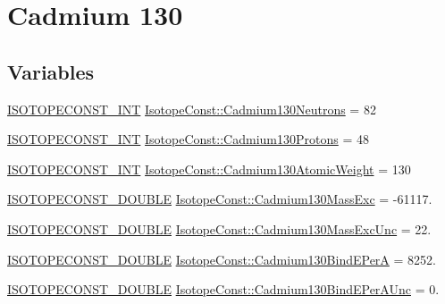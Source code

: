 \hypertarget{group___isotope_const-_cadmium-_cd130}{}\section{Cadmium 130}
\label{group___isotope_const-_cadmium-_cd130}
\subsection*{Variables}
\begin{DoxyCompactItemize}
\item 
\mbox{\hyperlink{group___isotope_const-_macros_ga5f18360b3e99483a35c32d789e62621c}{I\+S\+O\+T\+O\+P\+E\+C\+O\+N\+S\+T\+\_\+\+I\+NT}} \mbox{\hyperlink{group___isotope_const-_cadmium-_cd130_gaacc3bf0a1a699ef1e801e687e548a5df}{Isotope\+Const\+::\+Cadmium130\+Neutrons}} = 82
\item 
\mbox{\hyperlink{group___isotope_const-_macros_ga5f18360b3e99483a35c32d789e62621c}{I\+S\+O\+T\+O\+P\+E\+C\+O\+N\+S\+T\+\_\+\+I\+NT}} \mbox{\hyperlink{group___isotope_const-_cadmium-_cd130_ga5b8234c01437195f8fe9cbf0a4318621}{Isotope\+Const\+::\+Cadmium130\+Protons}} = 48
\item 
\mbox{\hyperlink{group___isotope_const-_macros_ga5f18360b3e99483a35c32d789e62621c}{I\+S\+O\+T\+O\+P\+E\+C\+O\+N\+S\+T\+\_\+\+I\+NT}} \mbox{\hyperlink{group___isotope_const-_cadmium-_cd130_ga6cf69b042d5b1b2da75dd718f164ce2d}{Isotope\+Const\+::\+Cadmium130\+Atomic\+Weight}} = 130
\item 
\mbox{\hyperlink{group___isotope_const-_macros_ga8f45a7272ce02c0b4c65c44636ed719a}{I\+S\+O\+T\+O\+P\+E\+C\+O\+N\+S\+T\+\_\+\+D\+O\+U\+B\+LE}} \mbox{\hyperlink{group___isotope_const-_cadmium-_cd130_ga9df458bf60ba75393d56ed997371ef48}{Isotope\+Const\+::\+Cadmium130\+Mass\+Exc}} = -\/61117.
\item 
\mbox{\hyperlink{group___isotope_const-_macros_ga8f45a7272ce02c0b4c65c44636ed719a}{I\+S\+O\+T\+O\+P\+E\+C\+O\+N\+S\+T\+\_\+\+D\+O\+U\+B\+LE}} \mbox{\hyperlink{group___isotope_const-_cadmium-_cd130_gacb2c237768c0529cfb0e26281875f373}{Isotope\+Const\+::\+Cadmium130\+Mass\+Exc\+Unc}} = 22.
\item 
\mbox{\hyperlink{group___isotope_const-_macros_ga8f45a7272ce02c0b4c65c44636ed719a}{I\+S\+O\+T\+O\+P\+E\+C\+O\+N\+S\+T\+\_\+\+D\+O\+U\+B\+LE}} \mbox{\hyperlink{group___isotope_const-_cadmium-_cd130_ga10ec9b45829fd8bdb4214468d1c1c55d}{Isotope\+Const\+::\+Cadmium130\+Bind\+E\+PerA}} = 8252.
\item 
\mbox{\hyperlink{group___isotope_const-_macros_ga8f45a7272ce02c0b4c65c44636ed719a}{I\+S\+O\+T\+O\+P\+E\+C\+O\+N\+S\+T\+\_\+\+D\+O\+U\+B\+LE}} \mbox{\hyperlink{group___isotope_const-_cadmium-_cd130_gadbf0b350e38f6aea2bee8baa4244a268}{Isotope\+Const\+::\+Cadmium130\+Bind\+E\+Per\+A\+Unc}} = 0.

\end{DoxyCompactItemize}
